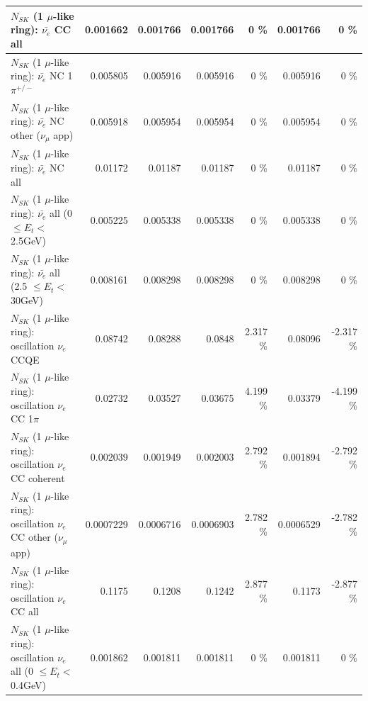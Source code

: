 \begin{table}
\begin{tabular}{| l | r | r | r  r | r  r |}
                            $N_{SK}$ (1 $\mu$-like ring): $\bar{\nu_{e}}$ CC all &        0.001662 &        0.001766 &        0.001766 &        0 \%  &        0.001766 &        0 \%  \\ 
\hline
                     $N_{SK}$ (1 $\mu$-like ring): $\bar{\nu_e}$ NC 1$\pi^{+/-}$ &        0.005805 &        0.005916 &        0.005916 &        0 \%  &        0.005916 &        0 \%  \\ 
            $N_{SK}$ (1 $\mu$-like ring): $\bar{\nu_e}$ NC other ($\nu_\mu$ app) &        0.005918 &        0.005954 &        0.005954 &        0 \%  &        0.005954 &        0 \%  \\ 
                            $N_{SK}$ (1 $\mu$-like ring): $\bar{\nu_{e}}$ NC all &         0.01172 &         0.01187 &         0.01187 &        0 \%  &         0.01187 &        0 \%  \\ 
\hline
     $N_{SK}$ (1 $\mu$-like ring): $\bar{\nu_{e}}$ all (0 $\leq E_{t} <$ 2.5GeV) &        0.005225 &        0.005338 &        0.005338 &        0 \%  &        0.005338 &        0 \%  \\ 
    $N_{SK}$ (1 $\mu$-like ring): $\bar{\nu_{e}}$ all (2.5 $\leq E_{t} <$ 30GeV) &        0.008161 &        0.008298 &        0.008298 &        0 \%  &        0.008298 &        0 \%  \\ 
\hline
\hline
\hline
                          $N_{SK}$ (1 $\mu$-like ring): oscillation $\nu_e$ CCQE &         0.08742 &         0.08288 &          0.0848 &    2.317 \%  &         0.08096 &   -2.317 \%  \\ 
                     $N_{SK}$ (1 $\mu$-like ring): oscillation $\nu_e$ CC 1$\pi$ &         0.02732 &         0.03527 &         0.03675 &    4.199 \%  &         0.03379 &   -4.199 \%  \\ 
                   $N_{SK}$ (1 $\mu$-like ring): oscillation $\nu_e$ CC coherent &        0.002039 &        0.001949 &        0.002003 &    2.792 \%  &        0.001894 &   -2.792 \%  \\ 
      $N_{SK}$ (1 $\mu$-like ring): oscillation $\nu_e$ CC other ($\nu_\mu$ app) &       0.0007229 &       0.0006716 &       0.0006903 &    2.782 \%  &       0.0006529 &   -2.782 \%  \\ 
                       $N_{SK}$ (1 $\mu$-like ring): oscillation $\nu_e$  CC all &          0.1175 &          0.1208 &          0.1242 &    2.877 \%  &          0.1173 &   -2.877 \%  \\ 
\hline
$N_{SK}$ (1 $\mu$-like ring): oscillation $\nu_{e}$ all (0 $\leq E_{t} <$ 0.4GeV) &        0.001862 &        0.001811 &        0.001811 &        0 \%  &        0.001811 &        0 \%  \\ 

\end{tabular}
\end{table}
